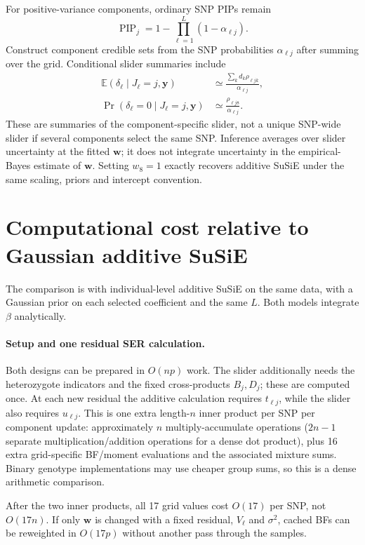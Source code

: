 \documentclass[11pt]{article}
\newcommand{\E}{\mathbb E}
\begin{document}
For positive-variance components, ordinary SNP PIPs remain
\begin{equation}
 \operatorname{PIP}_j=1-\prod_{\ell=1}^L(1-\alpha_{\ell j}).
 \label{eq:pip}
\end{equation}
Construct component credible sets from the SNP probabilities
$\alpha_{\ell j}$ after summing over the grid. Conditional slider
summaries include
\begin{align}
 \E(\delta_\ell\mid J_\ell=j,\mathbf y)
     &\simeq\frac{\sum_k d_k\rho_{\ell jk}}{\alpha_{\ell j}},\nonumber\\
 \Pr(\delta_\ell=0\mid J_\ell=j,\mathbf y)
     &\simeq\frac{\rho_{\ell j8}}{\alpha_{\ell j}}.
 \label{eq:delta-summary}
\end{align}
These are summaries of the component-specific slider, not a unique
SNP-wide slider if several components select the same SNP.
Inference averages over slider uncertainty at the fitted $\mathbf w$;
it does not integrate uncertainty in the empirical-Bayes estimate of
$\mathbf w$. Setting $w_8=1$ exactly recovers additive SuSiE under
the same scaling, priors and intercept convention.

\newpage
\section{Computational cost relative to Gaussian additive SuSiE}
The comparison is with individual-level additive SuSiE on the same data,
with a Gaussian prior on each selected coefficient and the same $L$.
Both models integrate $\beta$ analytically.

\paragraph{Setup and one residual SER calculation.}
Both designs can be prepared in $O(np)$ work. The slider additionally
needs the heterozygote indicators and the fixed cross-products
$B_j,D_j$; these are computed once. At each new residual the additive
calculation requires $t_{\ell j}$, while the slider also requires
$u_{\ell j}$. This is one extra length-$n$ inner product per SNP per
component update: approximately $n$ multiply-accumulate operations
($2n-1$ separate multiplication/addition operations for a dense dot
product), plus 16 extra grid-specific BF/moment evaluations and
the associated mixture sums. Binary genotype implementations may use
cheaper group sums, so this is a dense arithmetic comparison.

After the two inner products, all 17 grid values cost $O(17)$ per SNP,
not $O(17n)$. If only $\mathbf w$ is changed with a fixed residual,
$V_\ell$ and $\sigma^2$, cached BFs can be reweighted in $O(17p)$
without another pass through the samples.
\end{document}
